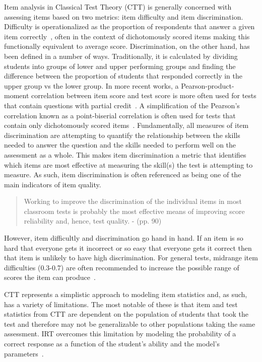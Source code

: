 \documentclass[authorversion,nonacm]{acmart}
\begin{document}
Item analysis in Classical Test Theory (CTT) is generally concerned with
assessing items based on two metrics: item difficulty and item discrimination.
Difficulty is operationalized as the proportion of respondents that answer a
given item correctly~\cite{engelhart1965comparison, brennan1972generalized},
often in the context of dichotomously scored items making this functionally
equivalent to average score.  Discrimination, on the other hand, has been
defined in a number of ways.  Traditionally, it is calculated by dividing
students into groups of lower and upper performing groups and finding the difference
between
the proportion of students that responded correctly in the upper group vs the
lower group. In more recent works, a Pearson-product-moment correlation between
item score and test score is more often used for tests that contain questions
with partial credit~\cite{setiawan2014simulation}. A simplification of the
Pearson's correlation known as a point-biserial correlation is often used for
tests that contain only dichotomously scored items~\cite{kornbrot2014point}.
Fundamentally, all measures of item discrimination are attempting to quantify
the relationship between the skills needed to answer the question and the skills
needed to perform well on the assessment as a whole. This makes item discrimination a
metric that identifies which items are most effective at measuring the skill(s)
the test is attempting to measure.  As such, item discrimination is often
referenced as being one of the main indicators of item quality. 
\begin{quote}
    Working to improve the discrimination of the individual items in most
    classroom tests is probably the most effective means of improving score
    reliability and, hence, test quality. - \citet{ebel1972essentials} (pp. 90)
\end{quote}
However, item difficultly and discrimination go hand in hand. If an item is
so hard that everyone gets it incorrect or so easy that everyone gets it correct then that item is unlikely to have high discrimination. For general tests, midrange item difficulties (0.3-0.7)
are often recommended to increase the possible range of scores the item can
produce~\cite{lord1953application, ebel1972essentials, hotiu2006relationship}.

CTT represents a simplistic approach to modeling item statistics and, as such,
has a variety of limitations. The most notable of these is that item and test
statistics from CTT are dependent on the population of students that took the
test and therefore may not be generalizable to other populations taking the
same assessment. IRT overcomes this limitation by modeling the probability of a
correct response as a function of the student's ability and the model's
parameters~\cite{fan1998item, de2010primer}.
\end{document}

